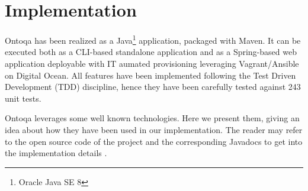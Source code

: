 \section{Implementation}
\label{sec:implementation}

Ontoqa has been realized as a Java\footnote{Oracle Java SE 8} application, packaged with Maven.
%
It can be executed both as a CLI-based standalone application and as a Spring-based web application deployable with IT aumated provisioning leveraging Vagrant/Ansible on Digital Ocean.
%
All features have been implemented following the Test Driven Development (TDD) discipline, hence they have been carefully tested against 243 unit tests.

Ontoqa leverages some well known technologies. 
%
Here we present them, giving an idea about how they have been used in our implementation. 
%
The reader may refer to the open source code of the project and the corresponding Javadocs to get into the implementation details \cite{ontoqa}.

